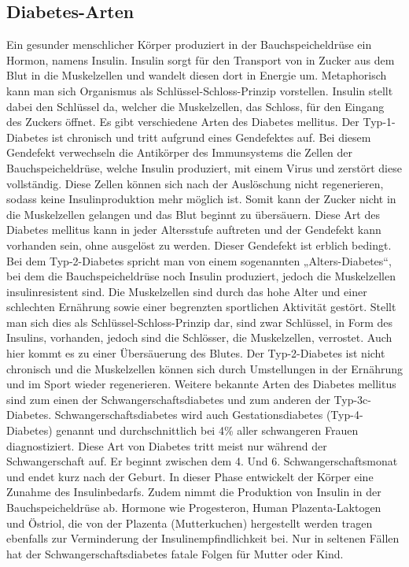 \documentclass[a4paper,11pt]{article}%
\renewcommand{\\}{\vspace*{0.5\baselineskip} \newline}
\begin{document}
	\subsection{Diabetes-Arten}
		Ein gesunder menschlicher Körper produziert in der Bauchspeicheldrüse ein Hormon, namens Insulin. Insulin sorgt für den Transport von in Zucker aus dem Blut in die Muskelzellen und wandelt diesen dort in Energie um. Metaphorisch kann man sich Organismus als Schlüssel-Schloss-Prinzip vorstellen. Insulin stellt dabei den Schlüssel da, welcher die Muskelzellen, das Schloss, für den Eingang des Zuckers öffnet. Es gibt verschiedene Arten des Diabetes mellitus. \\	
		Der Typ-1-Diabetes ist chronisch und tritt aufgrund eines Gendefektes auf. Bei diesem Gendefekt verwechseln die Antikörper des Immunsystems die Zellen der Bauchspeicheldrüse, welche Insulin produziert, mit einem Virus und zerstört diese vollständig. Diese Zellen können sich nach der Auslöschung nicht regenerieren, sodass keine Insulinproduktion mehr möglich ist. Somit kann der Zucker nicht in die Muskelzellen gelangen und das Blut beginnt zu übersäuern. Diese Art des Diabetes mellitus kann in jeder Altersstufe auftreten und der Gendefekt kann vorhanden sein, ohne ausgelöst zu werden. Dieser Gendefekt ist erblich bedingt.\\
		Bei dem Typ-2-Diabetes spricht man von einem sogenannten „Alters-Diabetes“, bei dem die Bauchspeicheldrüse noch Insulin produziert, jedoch die Muskelzellen insulinresistent sind. Die Muskelzellen sind durch das hohe Alter und einer schlechten Ernährung sowie einer begrenzten sportlichen Aktivität gestört. Stellt man sich dies als Schlüssel-Schloss-Prinzip dar, sind zwar Schlüssel, in Form des Insulins, vorhanden, jedoch sind die Schlösser, die Muskelzellen, verrostet. Auch hier kommt es zu einer Übersäuerung des Blutes. Der Typ-2-Diabetes ist nicht chronisch und die Muskelzellen können sich durch Umstellungen in der Ernährung und im Sport wieder regenerieren.\\
		Weitere bekannte Arten des Diabetes mellitus sind zum einen der Schwangerschaftsdiabetes und zum anderen der Typ-3c-Diabetes.\newline
		Schwangerschaftsdiabetes wird auch Gestationsdiabetes (Typ-4-Diabetes) genannt und durchschnittlich bei 4\% aller schwangeren Frauen diagnostiziert. Diese Art von Diabetes tritt meist nur während der Schwangerschaft auf. Er beginnt zwischen dem 4. Und 6. Schwangerschaftsmonat und endet kurz nach der Geburt. In dieser Phase entwickelt der Körper eine Zunahme des Insulinbedarfs. Zudem nimmt die Produktion von Insulin in der Bauchspeicheldrüse ab. Hormone wie Progesteron, Human Plazenta-Laktogen und Östriol, die von der Plazenta (Mutterkuchen) hergestellt werden tragen ebenfalls zur Verminderung der Insulinempfindlichkeit bei. Nur in seltenen Fällen hat der Schwangerschaftsdiabetes fatale Folgen für Mutter oder Kind.\\
\end{document}
